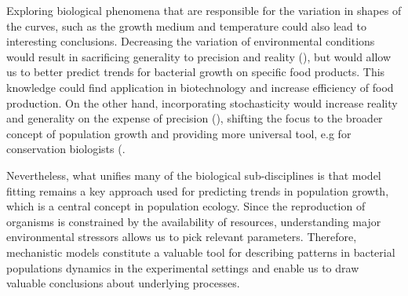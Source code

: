 \documentclass[a4paper,11pt]{article}
\begin{document}
Exploring biological phenomena that are responsible for the variation in shapes of the curves, such as the growth medium and temperature could also lead to interesting conclusions. Decreasing the variation of environmental conditions would result in sacrificing generality to precision and reality (\cite{levins1966strategy}), but would allow us to better predict trends for bacterial growth on specific food products. This knowledge could find application in biotechnology and increase efficiency of food production. On the other hand, incorporating stochasticity would increase reality and generality on the expense of precision (\cite{levins1966strategy}), shifting the focus to the broader concept of population growth and providing more universal tool, e.g for conservation biologists (\cite{manlik2022stochastic}.\par

Nevertheless, what unifies many of the biological sub-disciplines is that model fitting remains a key approach used for predicting trends in population growth, which is a central concept in population ecology. Since the reproduction of organisms is constrained by the availability of resources, understanding major environmental stressors allows us to pick relevant parameters. Therefore, mechanistic models constitute a valuable tool for describing patterns in bacterial populations dynamics in the experimental settings and enable us to draw valuable conclusions about underlying processes.



\end{document}
